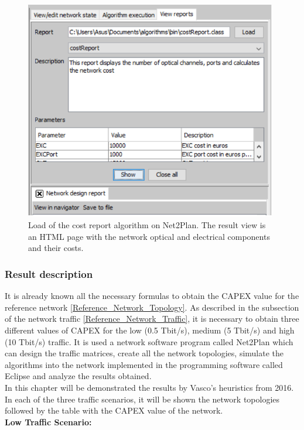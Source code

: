 \begin{figure}[H]
\centering
\includegraphics[width=11cm]{sdf/heuristic/transparent_survivability/figures/cost_report_transparent}
\caption{Load of the cost report algorithm on Net2Plan. The result view is an HTML page with the network optical and electrical components and their costs.}
\label{cost_report_transparent}
\end{figure}

\subsubsection{Result description}\label{result_description_transparent_heuristic_surv}

It is already known all the necessary formulas to obtain the CAPEX value for the reference network \ref{Reference_Network_Topology}. As described in the subsection of the network traffic \ref{Reference_Network_Traffic}, it is necessary to obtain three different values of CAPEX for the low (0.5 Tbit/s), medium (5 Tbit/s) and high (10 Tbit/s) traffic. It is used a network software program called Net2Plan which can design the traffic matrices, create all the network topologies, simulate the algorithms into the network implemented in the programming software called Eclipse and analyze the results obtained.\\
In this chapter will be demonstrated the results by Vasco's heuristics from 2016. In each of the three traffic scenarios, it will be shown the network topologies followed by the table with the CAPEX value of the network.\\

\noindent
\textbf{Low Traffic Scenario:}\\

